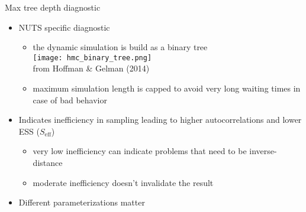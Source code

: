 \documentclass[finnish,english,t]{beamer}
\def\eff{\mathrm{eff}}
\begin{document}
\begin{frame}{Max tree depth diagnostic}

  \vspace{-0.5\baselineskip}
  \begin{itemize}
  \item NUTS specific diagnostic
    \begin{itemize}
    \item the dynamic simulation is build as a binary tree\\
      \texttt{[image: hmc\_binary\_tree.png]}\\ {\scriptsize from Hoffman \& Gelman (2014)}      
    \item<2-> maximum simulation length is capped to avoid very long
      waiting times in case of bad behavior
    \end{itemize}
  \item<3-> Indicates inefficiency in sampling leading to higher
    autocorrelations and lower ESS ($S_{\eff}$)
    \begin{itemize}
    \item very low inefficiency can indicate problems that need to be
      inverse-distance
    \item moderate inefficiency doesn't invalidate the result
    \end{itemize}
  \item<4-> Different parameterizations matter
  \end{itemize}

  
\end{frame}
\end{document}
